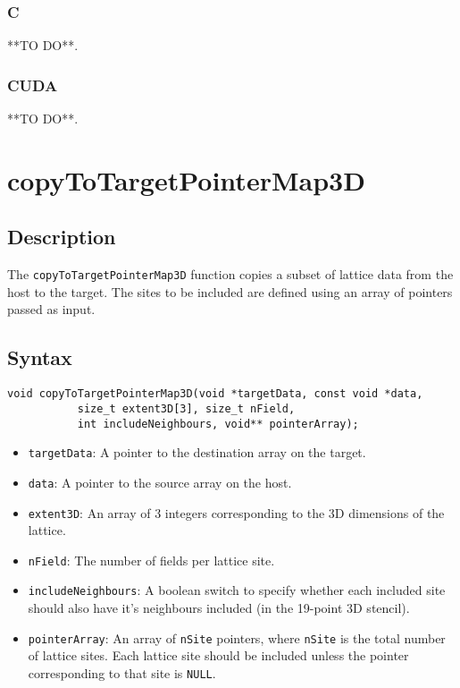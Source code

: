 \subsubsection{C}
**TO DO**.
\subsubsection{CUDA}
**TO DO**.
\newpage
\section{copyToTargetPointerMap3D}

\subsection{Description}

The \verb+copyToTargetPointerMap3D+ function copies a subset of lattice data from the host to the target. The sites to be included are defined using an array of pointers passed as input.

\subsection{Syntax}
\begin{verbatim}
void copyToTargetPointerMap3D(void *targetData, const void *data, 
           size_t extent3D[3], size_t nField, 
           int includeNeighbours, void** pointerArray);
\end{verbatim}

\begin{itemize}
\item \verb+targetData+: A pointer to the destination array on the target.
\item \verb+data+: A pointer to the source array on the host.
\item \verb+extent3D+: An array of 3 integers corresponding to the 3D dimensions of the lattice.
\item \verb+nField+: The number of fields per lattice site.
\item \verb+includeNeighbours+: A boolean switch to specify whether each included site should also have it's neighbours included (in the 19-point 3D stencil).
\item \verb+pointerArray+: An array of \verb+nSite+ pointers, where \verb+nSite+ is the total number of lattice sites. Each lattice site should be included unless the pointer corresponding to that site is \verb+NULL+.  
\end{itemize}



